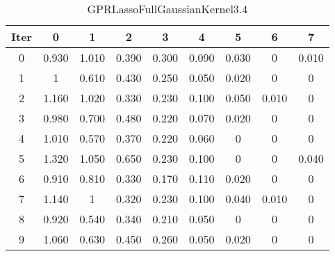 \begin{table}
	\begin{center}
		\begin{tabular}{|c|c|c|c|c|c|c|c|c|}
			\hline
			Iter & 0 & 1 & 2 & 3 & 4 & 5 & 6 & 7 \\
			\hline
			0 & 0.930 & 1.010 & 0.390 & 0.300 & 0.090 & 0.030 & 0 & 0.010 \\
			\hline
			1 & 1 & 0.610 & 0.430 & 0.250 & 0.050 & 0.020 & 0 & 0 \\
			\hline
			2 & 1.160 & 1.020 & 0.330 & 0.230 & 0.100 & 0.050 & 0.010 & 0 \\
			\hline
			3 & 0.980 & 0.700 & 0.480 & 0.220 & 0.070 & 0.020 & 0 & 0 \\
			\hline
			4 & 1.010 & 0.570 & 0.370 & 0.220 & 0.060 & 0 & 0 & 0 \\
			\hline
			5 & 1.320 & 1.050 & 0.650 & 0.230 & 0.100 & 0 & 0 & 0.040 \\
			\hline
			6 & 0.910 & 0.810 & 0.330 & 0.170 & 0.110 & 0.020 & 0 & 0 \\
			\hline
			7 & 1.140 & 1 & 0.320 & 0.230 & 0.100 & 0.040 & 0.010 & 0 \\
			\hline
			8 & 0.920 & 0.540 & 0.340 & 0.210 & 0.050 & 0 & 0 & 0 \\
			\hline
			9 & 1.060 & 0.630 & 0.450 & 0.260 & 0.050 & 0.020 & 0 & 0 \\
			\hline
		\end{tabular}
	\end{center}
	\caption{GPRLassoFullGaussianKernel3.4}
\end{table}